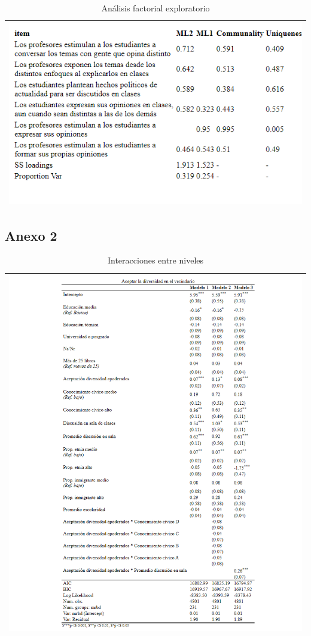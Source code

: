 \documentclass[12pt,twoside]{templates/facsothesis}
\begin{document}
\begin{longtable}[]{@{}l@{}}
\caption{\label{tab:anexo1}Análisis factorial exploratorio}\tabularnewline
\toprule()
\endhead
\includegraphics{IPO/output/tables/apdis_fa.png} \\
\bottomrule()
\end{longtable}

\hypertarget{anexo-2}{%
\subsection{Anexo 2}\label{anexo-2}}

\begin{longtable}[]{@{}l@{}}
\caption{\label{tab:interact}Interacciones entre niveles}\tabularnewline
\toprule()
\endhead
\includegraphics{IPO/output/tables/interac.png} \\
\bottomrule()
\end{longtable}
\end{document}
